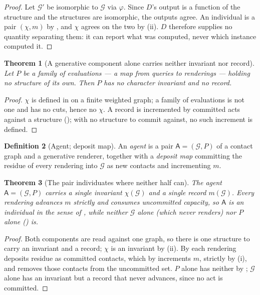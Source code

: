 \documentclass[11pt,a4paper]{article}
\theoremstyle{clstyle}
\newtheorem{theorem}{Theorem}[section]
\theoremstyle{definition}
\newtheorem{definition}[theorem]{Definition}
\theoremstyle{remark}
\newcommand{\Gph}{\mathcal{G}}
\newcommand{\Ag}{\mathsf{A}}
\newcommand{\Char}{\chi}
\newcommand{\rec}{m}
\begin{document}
\begin{proof}
Let $\Gph'$ be isomorphic to $\Gph$ via $\varphi$. Since $D$'s output is a
function of the structure and the structures are isomorphic, the outputs
agree. An individual is a pair $(\Char,\rec)$ by , and
$\Char$ agrees on the two by (ii). $D$ therefore supplies no
quantity separating them: it can report what was computed, never which
instance computed it.
\end{proof}

\begin{theorem}[A generative component alone carries neither invariant nor
record]
\label{thm:gen-blind}
Let $P$ be a family of evaluations --- a map from queries to renderings ---
holding no structure of its own. Then $P$ has no character invariant and no
record.
\end{theorem}

\begin{proof}
$\Char$ is defined in  on a finite weighted graph; a family of
evaluations is not one and has no cuts, hence no $\Char$. A record is
incremented by committed acts against a structure (); with
no structure to commit against, no such increment is defined.
\end{proof}

\begin{definition}[Agent; deposit map]
\label{def:pair}
An \emph{agent} is a pair $\Ag=(\Gph,P)$ of a contact graph and a generative
renderer, together with a \emph{deposit map} committing the residue of every
rendering into $\Gph$ as new contacts and incrementing $\rec$.
\end{definition}

\begin{theorem}[The pair individuates where neither half can]
\label{thm:pair}
The agent $\Ag=(\Gph,P)$ carries a single invariant $\Char(\Gph)$ and a
single record $\rec(\Gph)$. Every rendering advances $\rec$ strictly and
consumes uncommitted capacity, so $\Ag$ is an individual in the sense of
, while neither $\Gph$ alone (which never renders) nor
$P$ alone () is.
\end{theorem}

\begin{proof}
Both components are read against one graph, so there is one structure to
carry an invariant and a record; $\Char$ is an invariant by
(ii). By  each rendering deposits residue as
committed contacts, which by  increments $\rec$, strictly by
(i), and removes those contacts from the uncommitted set.
$P$ alone has neither by ; $\Gph$ alone has an invariant
but a record that never advances, since no act is committed.
\end{proof}
\end{document}
